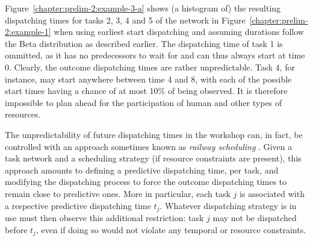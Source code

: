 	\begin{example}
		Figure~\ref{chapter:prelim-2:example-3-a} shows (a histogram of) the resulting dispatching times for tasks 2, 3, 4 and 5 
		of the network in Figure~\ref{chapter:prelim-2:example-1} when using earliest start dispatching 
		and assuming durations follow the Beta distribution as described earlier.
		The dispatching time of task 1 is ommitted, as it has no predecessors to wait for and can thus always start at time 0.
		Clearly, the outcome dispatching times are rather unpredictable.
		Task 4, for instance, may start anywhere between time 4 and 8,
		with each of the possible start times having a chance of at most 10\% of being observed.
		It is therefore impossible to plan ahead for the participation of human and other types of resources.
	\end{example}

	The unpredictability of future dispatching times in the workshop can, in fact, be controlled
	with an approach sometimes known as \emph{railway scheduling} \cite{van2005use}.
	Given a task network and a scheduling strategy (if resource constraints are present),
	this approach amounts to defining a predictive dispatching time, per task, and 
	modifying the dispatching process to force the outcome dispatching times to remain close to predictive ones.
	More in particular, each task $j$ is associated with a respective predictive dispatching time $t_j$.
	Whatever dispatching strategy is in use must then observe this additional restriction:
	task $j$ may not be dispatched before $t_j$, even if doing so would not violate any temporal or resource constraints.

